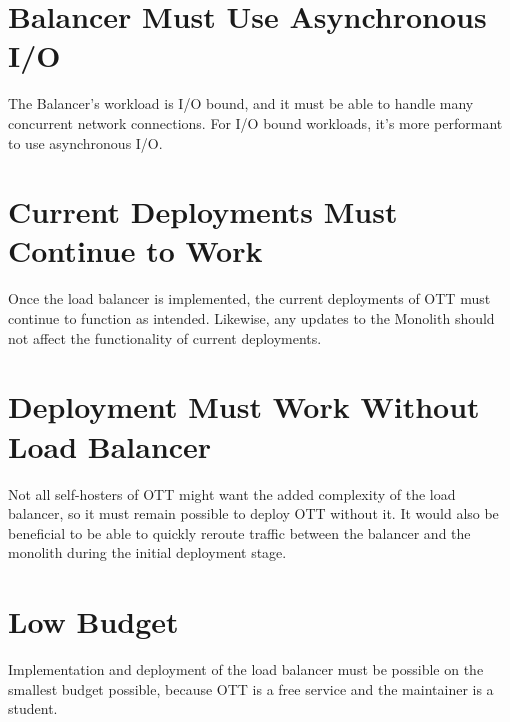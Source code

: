 \section{Balancer Must Use Asynchronous I/O   }

The Balancer's workload is I/O bound, and it must be able to handle many concurrent network connections. For I/O bound workloads, it's more performant to use asynchronous I/O\cite{async-vs-threads}.

\section{Current Deployments Must Continue to Work}

Once the load balancer is implemented, the current deployments of OTT must continue to function as intended. Likewise, any updates to the Monolith should not affect the functionality of current deployments.

\section{Deployment Must Work Without Load Balancer}

Not all self-hosters of OTT might want the added complexity of the load balancer, so it must remain possible to deploy OTT without it. It would also be beneficial to be able to quickly reroute traffic between the balancer and the monolith during the initial deployment stage.

\section{Low Budget}

Implementation and deployment of the load balancer must be possible on the smallest budget possible, because OTT is a free service and the maintainer is a student.
